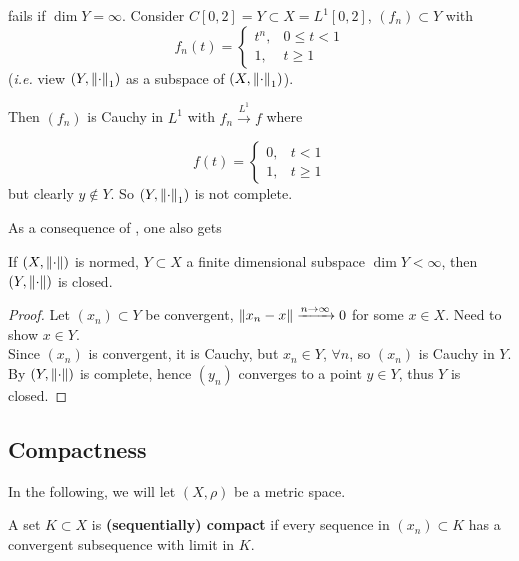 \documentclass{article}
\begin{document}
\begin{example}
     fails if $\dim Y =\infty$. Consider $C[0,2]=Y \subset X = L^1[0,2]$, $(f_n) \subset Y$ with  
    $$
    f_n(t) = \begin{cases}
        t^n, & 0\leq t <1 \\
        1, & t\geq 1
    \end{cases}
    $$  
    (\textit{i.e.} view $(Y, \left\|{\cdot}\right\|_1)$ as a subspace of $(X, \left\|{\cdot}\right\|_1)$). 
    
    Then $(f_n)$ is Cauchy in $L^1$ with $f_n \overset{L^1}{\longrightarrow} f$ where  

    $$
    f(t) = \begin{cases}
        0, & t<1 \\
        1, & t \geq 1
    \end{cases}
    $$  
    but clearly $y \notin Y$. So $(Y, \left\|{\cdot}\right\|_1)$ is not complete. 
\end{example}

As a consequence of , one also gets  

\begin{corollary}
\label{finite dim is closed}
    If $(X, \left\|{\cdot}\right\|)$ is normed, $Y \subset X$ a finite dimensional subspace $\dim Y < \infty$, then $(Y, \left\|{\cdot}\right\|)$ is closed.
\end{corollary}
\begin{proof}
    Let $(x_n)\subset Y$ be convergent, $\left\|{x_n-x}\right\|\xrightarrow{n\to\infty}0$ for some $x\in X$. Need to show $x\in Y$.\\
    Since $(x_n)$ is convergent, it is Cauchy, but $x_n\in Y$, $\forall  n$, so $(x_n)$ is Cauchy in $Y$. By  $(Y,\left\|{\cdot}\right\|)$ is complete, hence $(y_n)$ converges to a point $y\in Y$, thus $Y$ is closed.
\end{proof}

\subsection{Compactness}  

In the following, we will let $(X, \rho)$ be a metric 
space.  

\begin{definition}[Compact] \nextline
    A set $K \subset X$ is \textbf{(sequentially) compact} 
    if every sequence in $(x_n) \subset K$ has a convergent subsequence with limit in $K$.
\end{definition}    
\end{document}
